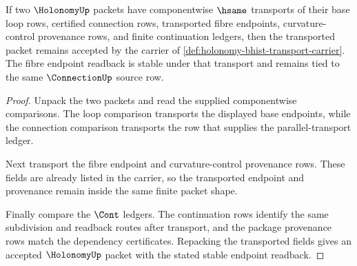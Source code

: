 \begin{theorem}
\label{thm:holonomy-continuation-transport-stability}
If two $\HolonomyUp$ packets have componentwise $\hsame$ transports of their base loop rows, certified connection rows, transported fibre endpoints, curvature-control provenance rows, and finite continuation ledgers, then the transported packet remains accepted by the carrier of \autoref{def:holonomy-bhist-transport-carrier}. The fibre endpoint readback is stable under that transport and remains tied to the same $\ConnectionUp$ source row.
\end{theorem}
\begin{proof}
Unpack the two packets and read the supplied componentwise comparisons. The loop comparison transports the displayed base endpoints, while the connection comparison transports the row that supplies the parallel-transport ledger.

Next transport the fibre endpoint and curvature-control provenance rows. These fields are already listed in the carrier, so the transported endpoint and provenance remain inside the same finite packet shape.

Finally compare the $\Cont$ ledgers. The continuation rows identify the same subdivision and readback routes after transport, and the package provenance rows match the dependency certificates. Repacking the transported fields gives an accepted $\HolonomyUp$ packet with the stated stable endpoint readback.
\end{proof}

